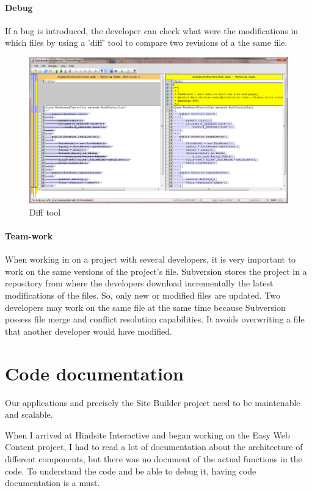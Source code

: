 \paragraph*{Debug}
If a bug is introduced, the developer can check what were the modifications in which files by using a 'diff' tool to compare two revisions of a the same file.

\begin{figure}[!ht]
\centering
\includegraphics[width=.85\textwidth]{img/diff.png}
\caption{Diff tool}
\label{figure:diff}
\end{figure}

\paragraph*{Team-work}
When working in on a project with several developers, it is very important to work on the same versions of the project's file. Subversion stores the project in a repository from where the developers download incrementally the latest modifications of the files. So, only new or modified files are updated. Two developers may work on the same file at the same time because Subversion possess file merge and conflict resolution capabilities. It avoids overwriting a file that another developer would have modified.

\section{Code documentation}
Our applications and precisely the Site Builder project need to be maintenable and scalable. 

When I arrived at Hindsite Interactive and began working on the Easy Web Content project, I had to read a lot of documentation about the architecture of different components, but there was no document of the actual functions in the code. To understand the code and be able to debug it, having code documentation is a must.
